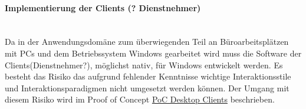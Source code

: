 \documentclass[11pt,oneside,a4paper,notitlepage]{article}
\begin{document}
%
\paragraph{Implementierung der Clients (? Dienstnehmer)}\\
Da in der Anwendungsdomäne zum überwiegenden Teil an Büroarbeitsplätzen mit PCs und dem Betriebssystem Windows gearbeitet wird muss die Software der Clients(Dienstnehmer?), möglichst
nativ, für Windows entwickelt werden. Es besteht das Risiko das aufgrund fehlender Kenntnisse wichtige Interaktionsstile und Interaktionsparadigmen nicht umgesetzt werden können.
Der Umgang mit diesem Risiko wird im Proof of Concept \href{}{PoC Desktop Clients} beschrieben.
\end{document}
